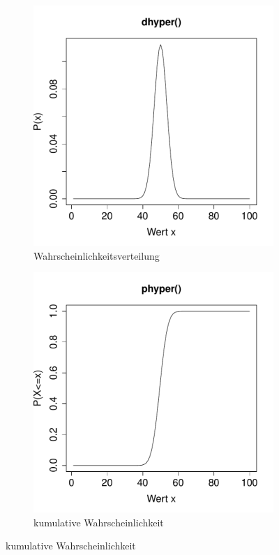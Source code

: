 \begin{figure}[h!]
\centering
\begin{subfigure}[b]{0.48\textwidth}
\includegraphics{verteilungen-005}
\caption{Wahrscheinlichkeitsverteilung}
\end{subfigure}
\begin{subfigure}[b]{0.48\textwidth}
\includegraphics{verteilungen-006}
\caption{kumulative Wahrscheinlichkeit}
\end{subfigure}


\end{figure}

